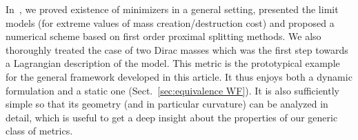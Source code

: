 
\iffalse %
\todo{Gabriel: I think the following paragraph could be removed.}

Let us introduce this Wasserstein-Fisher-Rao metric, denoted by $\WF$, from a physical point of view and in a smooth setting. Let $\Omega$ be a convex domain in $\R^d$ and $\rho_0,\rho_1$ two smooth and positive functions of finite integrals. The distance between $\rho_0$ and $\rho_1$ is given by the minimization over $v(t,x) \in \R^d$ and a time dependent vector field and $g(t,x)$ a real valued function of
\begin{equation}\label{WF}
\frac12 \int_0^1 \left[ \int_{\Omega} |v(t,x)|^2 \rho(t,x) \d x  + \delta^2 \int_{\Omega} |\alpha(t,x)|^2 \rho(t,x) \d x \right] \d t
\end{equation}
under the generalized continuity constraint and the boundary constraints
\[
\partial_t \rho(t,x) + \nabla \cdot (\rho(t,x) v(t,x)) = \alpha(t,x)\rho(t,x) \quad \rho(0,\cdot) = \rho_0 , \quad  \rho(1,\cdot) = \rho_1\, .
\]
\fi %

In~\cite{ChizatOTFR2015}, we proved existence of minimizers in a general setting, presented the limit models (for extreme values of mass creation/destruction cost) and proposed a numerical scheme based on first order proximal splitting methods. We also thoroughly treated the case of two Dirac masses which was the first step towards a Lagrangian description of the model. This metric is the prototypical example for the general framework developed in this article. It thus enjoys both a dynamic formulation and a static one (Sect.~\ref{sec:equivalence WF}). It is also sufficiently simple so that its geometry (and in particular curvature) can be analyzed in detail, which is useful to get a deep insight about the properties of our generic class of metrics. 





